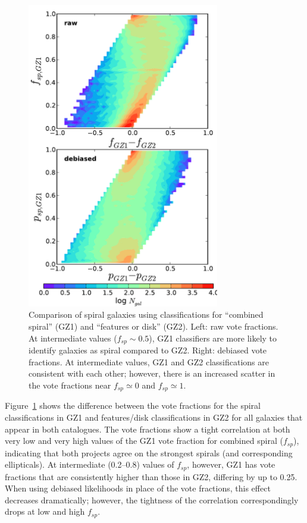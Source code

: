\documentclass[useAMS,usenatbib]{mn2e}
\begin{document}
\begin{figure}
\includegraphics[angle=0,width=3.3in]{figures/gz1_gz2_trumpet.pdf}
\caption{Comparison of spiral galaxies using classifications for ``combined spiral'' (GZ1) and ``features or disk'' (GZ2). Left: raw vote fractions. At intermediate values ($f_{sp}\sim0.5$), GZ1 classifiers are more likely to identify galaxies as spiral compared to GZ2. Right: debiased vote fractions. At intermediate values, GZ1 and GZ2 classifications are consistent with each other; however, there is an increased scatter in the vote fractions near $f_{sp}\simeq0$ and $f_{sp}\simeq1$. 
\label{fig-trumpet}}
\end{figure}

Figure~\ref{fig-trumpet} shows the difference between the vote fractions for the spiral classifications in GZ1 and features/disk classifications in GZ2 for all galaxies that appear in both catalogues. The vote fractions show a tight correlation at both very low and very high values of the GZ1 vote fraction for combined spiral ($f_{sp}$), indicating that both projects agree on the strongest spirals (and corresponding ellipticals). At intermediate (0.2--0.8) values of $f_{sp}$, however, GZ1 has vote fractions that are consistently higher than those in GZ2, differing by up to 0.25. When using debiased likelihoods in place of the vote fractions, this effect decreases dramatically; however, the tightness of the correlation correspondingly drops at low and high $f_{sp}$. 
\end{document}
